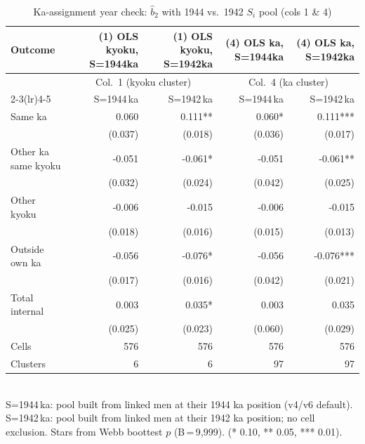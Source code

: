 \begin{table}[!htbp]
  \centering
  \caption{Ka-assignment year check: $\hat{b}_2$ with 1944 vs.\ 1942 $S_i$ pool (cols 1 \& 4)}
  \label{tab:ka_year_check}
  \begin{tabular}{lrrrr}
    \hline\hline
    Outcome & (1) OLS kyoku, S=1944ka & (1) OLS kyoku, S=1942ka & (4) OLS ka, S=1944ka & (4) OLS ka, S=1942ka \\
    \hline
    & \multicolumn{2}{c}{Col.\ 1 (kyoku cluster)} & \multicolumn{2}{c}{Col.\ 4 (ka cluster)} \\
    \cmidrule(lr){2-3}\cmidrule(lr){4-5}
    & S=1944\,ka & S=1942\,ka & S=1944\,ka & S=1942\,ka \\
    Same ka & 0.060 & 0.111** & 0.060* & 0.111*** \\
     & (0.037) & (0.018) & (0.036) & (0.017) \\
    Other ka same kyoku & -0.051 & -0.061* & -0.051 & -0.061** \\
     & (0.032) & (0.024) & (0.042) & (0.025) \\
    Other kyoku & -0.006 & -0.015 & -0.006 & -0.015 \\
     & (0.018) & (0.016) & (0.015) & (0.013) \\
    Outside own ka & -0.056 & -0.076* & -0.056 & -0.076*** \\
     & (0.017) & (0.016) & (0.042) & (0.021) \\
    Total internal & 0.003 & 0.035* & 0.003 & 0.035 \\
     & (0.025) & (0.023) & (0.060) & (0.029) \\
    \hline
    Cells & 576 & 576 & 576 & 576 \\
    Clusters & 6 & 6 & 97 & 97 \\
    \hline\hline
  \end{tabular}
  \\[4pt]
  \footnotesize
  S=1944\,ka: pool built from linked men at their 1944 ka position (v4/v6 default).
  S=1942\,ka: pool built from linked men at their 1942 ka position; no cell exclusion.
  Stars from Webb boottest $p$ (B\,=\,9{,}999). (* 0.10, ** 0.05, *** 0.01).
\end{table}
